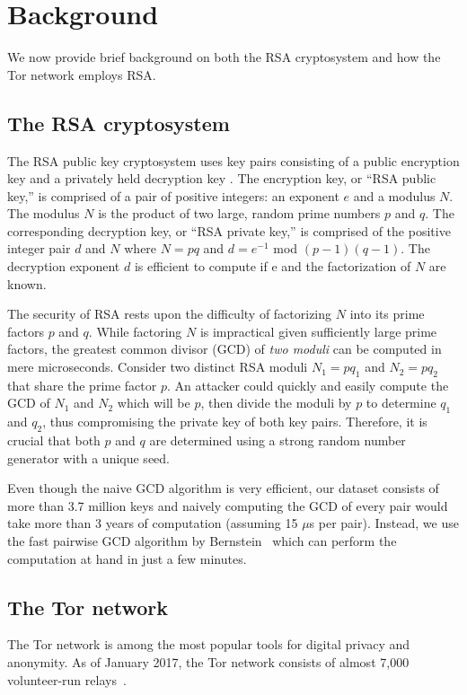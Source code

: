 \section{Background}
\label{sec:background}
We now provide brief background on both the RSA cryptosystem and how the Tor
network employs RSA.

\subsection{The RSA cryptosystem}
The RSA public key cryptosystem uses key pairs consisting of a public encryption
key and a privately held decryption key \cite{rivest1978}. The encryption key,
or ``RSA public key,'' is comprised of a pair of positive integers: an exponent
$e$ and a modulus $N$. The modulus $N$ is the product of two large, random prime
numbers $p$ and $q$. The corresponding decryption key, or ``RSA private key,''
is comprised of the positive integer pair $d$ and $N$ where $N = pq$ and $d =
e^{-1}$ mod $(p - 1)(q - 1)$.  The decryption exponent $d$ is efficient to
compute if e and the factorization of $N$ are known.

The security of RSA rests upon the difficulty of factorizing $N$ into its prime
factors $p$ and $q$.  While factoring $N$ is impractical given sufficiently
large prime factors, the greatest common divisor (GCD) of \emph{two moduli} can
be computed in mere microseconds.  Consider two distinct RSA moduli $N_1 = pq_1$
and $N_2 = pq_2$ that share the prime factor $p$.  An attacker could quickly and
easily compute the GCD of $N_1$ and $N_2$ which will be $p$, then divide the
moduli by $p$ to determine $q_1$ and $q_2$, thus compromising the private key of
both key pairs.  Therefore, it is crucial that both $p$ and $q$ are determined
using a strong random number generator with a unique seed.

Even though the naive GCD algorithm is very efficient, our dataset consists of
more than 3.7 million keys and naively computing the GCD of every pair would
take more than 3 years of computation (assuming 15 $\mu$s per pair). Instead,
we use the fast pairwise GCD algorithm by Bernstein~\cite{Bernstein04} which
can perform the computation at hand in just a few minutes.

\subsection{The Tor network}
\label{sec:tor-network}
The Tor network is among the most popular tools for digital privacy and
anonymity. As of January 2017, the Tor network consists of almost 7,000
volunteer-run relays~\cite{tormetrics}.

